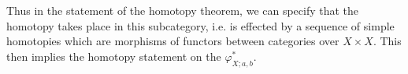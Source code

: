 \documentclass[11pt]{article}
\begin{document}
Thus in the statement of the homotopy theorem, we can specify that the homotopy takes place in this subcategory, i.e. is effected by a sequence of simple homotopies which are morphisms of functors between categories over $X\times X$. This then implies the homotopy statement on the $\varphi^*_{X;a,b}$.
\end{document}
